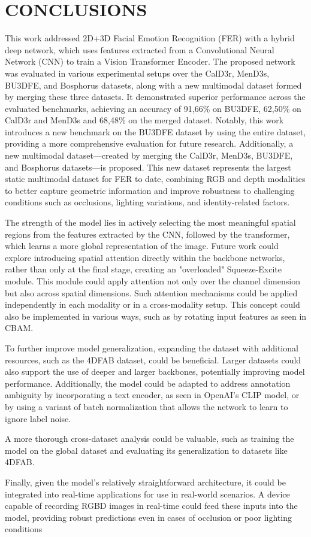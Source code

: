 
\section{CONCLUSIONS}

This work addressed 2D+3D Facial Emotion Recognition (FER) with a hybrid deep network, which uses features extracted from a Convolutional Neural Network (CNN) to train a Vision Transformer Encoder. The proposed network was evaluated in various experimental setups over the CalD3r, MenD3s, BU3DFE, and Bosphorus datasets, along with a new multimodal dataset formed by merging these three datasets. It demonstrated superior performance across the evaluated benchmarks, achieving an accuracy of 91,66\% on BU3DFE, 62,50\% on CalD3r and MenD3s and 68,48\% on the merged dataset. Notably, this work introduces a new benchmark on the BU3DFE dataset by using the entire dataset, providing a more comprehensive evaluation for future research. Additionally, a new multimodal dataset—created by merging the CalD3r, MenD3s, BU3DFE, and Bosphorus datasets—is proposed. This new dataset represents the largest static multimodal dataset for FER to date, combining RGB and depth modalities to better capture geometric information and improve robustness to challenging conditions such as occlusions, lighting variations, and identity-related factors.

The strength of the model lies in actively selecting the most meaningful spatial regions from the features extracted by the CNN, followed by the transformer, which learns a more global representation of the image. Future work could explore introducing spatial attention directly within the backbone networks, rather than only at the final stage, creating an "overloaded" Squeeze-Excite module. This module could apply attention not only over the channel dimension but also across spatial dimensions. Such attention mechanisms could be applied independently in each modality or in a cross-modality setup. This concept could also be implemented in various ways, such as by rotating input features as seen in CBAM.

To further improve model generalization, expanding the dataset with additional resources, such as the 4DFAB dataset, could be beneficial. Larger datasets could also support the use of deeper and larger backbones, potentially improving model performance. Additionally, the model could be adapted to address annotation ambiguity by incorporating a text encoder, as seen in OpenAI's CLIP model, or by using a variant of batch normalization that allows the network to learn to ignore label noise.

A more thorough cross-dataset analysis could be valuable, such as training the model on the global dataset and evaluating its generalization to datasets like 4DFAB.

Finally, given the model's relatively straightforward architecture, it could be integrated into real-time applications for use in real-world scenarios. A device capable of recording RGBD images in real-time could feed these inputs into the model, providing robust predictions even in cases of occlusion or poor lighting conditions


